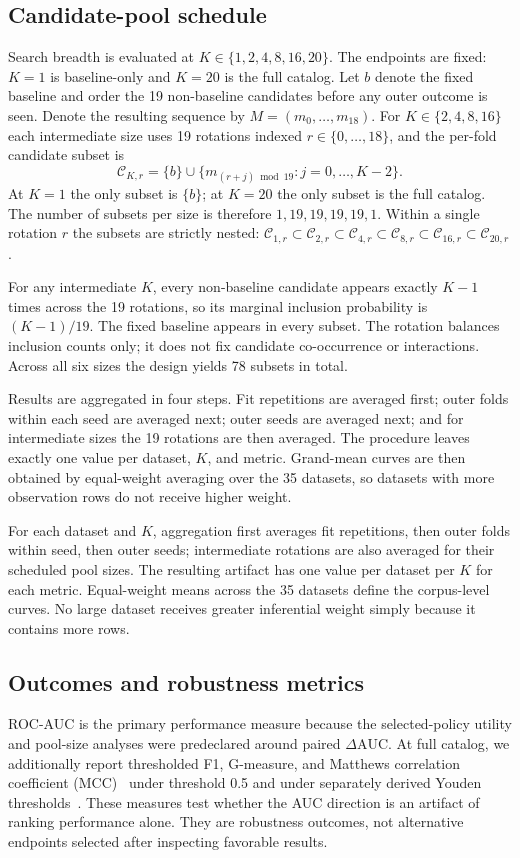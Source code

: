 \documentclass[referee]{USG}
\newcommand{\dauc}{\ensuremath{\Delta\mathrm{AUC}}}
\begin{document}
\subsection{Candidate-pool schedule}
Search breadth is evaluated at $K\in\{1,2,4,8,16,20\}$. The endpoints are fixed: $K=1$ is baseline-only and $K=20$ is the full catalog. Let $b$ denote the fixed baseline and order the 19 non-baseline candidates before any outer outcome is seen. Denote the resulting sequence by $M=(m_0,\ldots,m_{18})$. For $K\in\{2,4,8,16\}$ each intermediate size uses 19 rotations indexed $r\in\{0,\ldots,18\}$, and the per-fold candidate subset is
\begin{equation}
 \mathcal C_{K,r}=\{b\}\cup\{m_{(r+j)\bmod 19}:j=0,\ldots,K-2\}.
\end{equation}
At $K=1$ the only subset is $\{b\}$; at $K=20$ the only subset is the full catalog. The number of subsets per size is therefore $1,19,19,19,19,1$. Within a single rotation $r$ the subsets are strictly nested:
$\mathcal C_{1,r}\subset\mathcal C_{2,r}\subset\mathcal C_{4,r}\subset\mathcal C_{8,r}\subset\mathcal C_{16,r}\subset\mathcal C_{20,r}$.

For any intermediate $K$, every non-baseline candidate appears exactly $K-1$ times across the 19 rotations, so its marginal inclusion probability is $(K-1)/19$. The fixed baseline appears in every subset. The rotation balances inclusion counts only; it does not fix candidate co-occurrence or interactions. Across all six sizes the design yields 78 subsets in total.

Results are aggregated in four steps. Fit repetitions are averaged first; outer folds within each seed are averaged next; outer seeds are averaged next; and for intermediate sizes the 19 rotations are then averaged. The procedure leaves exactly one value per dataset, $K$, and metric. Grand-mean curves are then obtained by equal-weight averaging over the 35 datasets, so datasets with more observation rows do not receive higher weight.

For each dataset and $K$, aggregation first averages fit repetitions, then outer folds within seed, then outer seeds; intermediate rotations are also averaged for their scheduled pool sizes. The resulting artifact has one value per dataset per $K$ for each metric. Equal-weight means across the 35 datasets define the corpus-level curves. No large dataset receives greater inferential weight simply because it contains more rows.

\subsection{Outcomes and robustness metrics}
ROC-AUC is the primary performance measure because the selected-policy utility and pool-size analyses were predeclared around paired \dauc. At full catalog, we additionally report thresholded F1, G-measure, and Matthews correlation coefficient (MCC)~\cite{chicco2020mcc} under threshold 0.5 and under separately derived Youden thresholds~\cite{youden1950index}. These measures test whether the AUC direction is an artifact of ranking performance alone. They are robustness outcomes, not alternative endpoints selected after inspecting favorable results.
\end{document}
